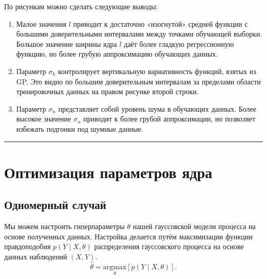 \documentclass[11pt,a4paper]{article}
\providecommand{\tightlist}{%
      \setlength{\itemsep}{0pt}\setlength{\parskip}{0pt}}
\begin{document}
    \begin{center}
    \end{center}

    По рисункам можно сделать следующие выводы:

\begin{enumerate}
\def\labelenumi{\arabic{enumi}.}
\tightlist
\item
  Малое значения \(l\) приводит к достаточно «изогнутой» средней функции
  с большими доверительными интервалами между точками обучающей выборки.
  Большое значение ширины ядра \(l\) даёт более гладкую регрессионную
  функцию, но более грубую аппроксимацию обучающих данных.
\item
  Параметр \(\sigma_k\) контролирует вертикальную вариативность функций,
  взятых из GP. Это видно по большим доверительным интервалам за
  пределами области тренировочных данных на правом рисунке второй
  строки.
\item
  Параметр \(\sigma_n\) представляет собой уровень шума в обучающих
  данных. Более высокое значение \(\sigma_n\) приводит к более грубой
  аппроксимации, но позволяет избежать подгонки под шумные данные.
\end{enumerate}

    \begin{center}\rule{0.5\linewidth}{0.5pt}\end{center}

    \hypertarget{ux43eux43fux442ux438ux43cux438ux437ux430ux446ux438ux44f-ux43fux430ux440ux430ux43cux435ux442ux440ux43eux432-ux44fux434ux440ux430}{%
\section{Оптимизация параметров
ядра}\label{ux43eux43fux442ux438ux43cux438ux437ux430ux446ux438ux44f-ux43fux430ux440ux430ux43cux435ux442ux440ux43eux432-ux44fux434ux440ux430}}

    \hypertarget{ux43eux434ux43dux43eux43cux435ux440ux43dux44bux439-ux441ux43bux443ux447ux430ux439}{%
\subsection{Одномерный
случай}\label{ux43eux434ux43dux43eux43cux435ux440ux43dux44bux439-ux441ux43bux443ux447ux430ux439}}

    Мы можем настроить гиперпараметры \(\theta\) нашей гауссовской модели
процесса на основе полученных данных. Настройка делается путём
максимизации функции правдоподобия \(p(Y \mid X, \theta)\) распределения
гауссовского процесса на основе данных наблюдений \((X, Y)\). \[
  \hat{\theta}  = \underset{\theta}{\text{argmax}} \left[ p(Y \mid X, \theta) \right].
\]
\end{document}
